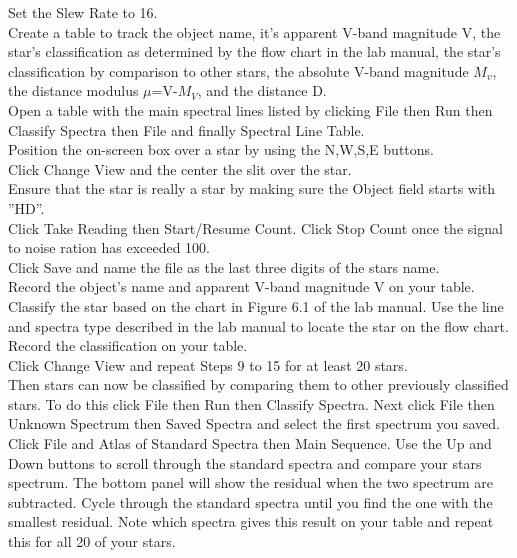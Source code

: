 \documentclass{article}
\begin{document}
Set the Slew Rate to 16.\\

Create a table to track the object name, it's apparent V-band magnitude V, the star's classification as determined by the flow chart in the lab manual, the star's classification by comparison to other stars, the absolute V-band magnitude $M_v$, the distance modulus $\mu$=V-$M_V$, and the distance D.\\

Open a table with the main spectral lines listed by clicking File then Run then Classify Spectra then File and finally Spectral Line Table.\\

Position the on-screen box over a star by using the N,W,S,E buttons.\\

Click Change View and the center the slit over the star.\\

Ensure that the star is really a star by making sure the Object field starts with ''HD''.\\

Click Take Reading then Start/Resume Count. Click Stop Count once the signal to noise ration has exceeded 100.\\

Click Save and name the file as the last three digits of the stars name.\\

Record the object's name and apparent V-band magnitude V on your table.\\

Classify the star based on the chart in Figure 6.1 of the lab manual. Use the line and spectra type described in the lab manual to locate the star on the flow chart. Record the classification on your table.\\

Click Change View and repeat Steps 9 to 15 for at least 20 stars.\\

Then stars can now be classified by comparing them to other previously classified stars. To do this click File then Run then Classify Spectra. Next click File then Unknown Spectrum then Saved Spectra and select the first spectrum you saved.\\

Click File and Atlas of Standard Spectra then Main Sequence. Use the Up and Down buttons to scroll through the standard spectra and compare your stars spectrum. The bottom panel will show the residual when the two spectrum are subtracted. Cycle through the standard spectra until you find the one with the smallest residual. Note which spectra gives this result on your table and repeat this for all 20 of your stars.\\
\end{document}
